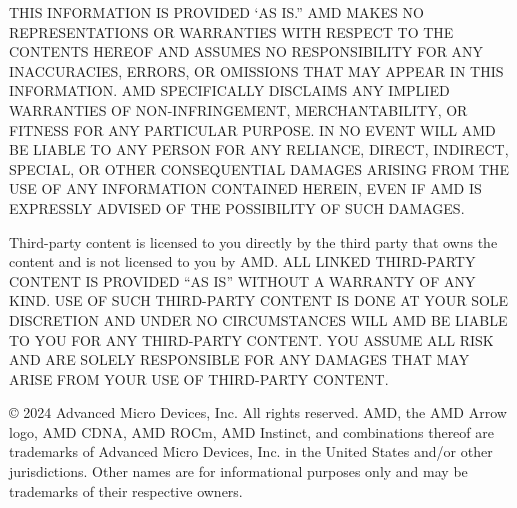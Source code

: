 \documentclass[
]{article}
\begin{document}
THIS INFORMATION IS PROVIDED ‘AS IS.” AMD MAKES NO REPRESENTATIONS OR WARRANTIES WITH RESPECT TO THE CONTENTS HEREOF AND ASSUMES NO RESPONSIBILITY FOR ANY INACCURACIES, ERRORS, OR OMISSIONS THAT MAY APPEAR IN THIS INFORMATION. AMD SPECIFICALLY DISCLAIMS ANY IMPLIED WARRANTIES OF NON-INFRINGEMENT, MERCHANTABILITY, OR FITNESS FOR ANY PARTICULAR PURPOSE. IN NO EVENT WILL AMD BE LIABLE TO ANY PERSON FOR ANY RELIANCE, DIRECT, INDIRECT, SPECIAL, OR OTHER CONSEQUENTIAL DAMAGES ARISING FROM THE USE OF ANY INFORMATION CONTAINED HEREIN, EVEN IF AMD IS EXPRESSLY ADVISED OF THE POSSIBILITY OF SUCH DAMAGES.



Third-party content is licensed to you directly by the third party that owns the content and is not licensed to you by AMD.  ALL LINKED THIRD-PARTY CONTENT IS PROVIDED “AS IS” WITHOUT A WARRANTY OF ANY KIND.  USE OF SUCH THIRD-PARTY CONTENT IS DONE AT YOUR SOLE DISCRETION AND UNDER NO CIRCUMSTANCES WILL AMD BE LIABLE TO YOU FOR ANY THIRD-PARTY CONTENT.  YOU ASSUME ALL RISK AND ARE SOLELY RESPONSIBLE FOR ANY DAMAGES THAT MAY ARISE FROM YOUR USE OF THIRD-PARTY CONTENT.



© 2024 Advanced Micro Devices, Inc. All rights reserved. AMD, the AMD Arrow logo, AMD CDNA, AMD ROCm, AMD Instinct, and combinations thereof are trademarks of Advanced Micro Devices, Inc. in the United States and/or other jurisdictions. Other names are for informational purposes only and may be trademarks of their respective owners.
\end{document}
